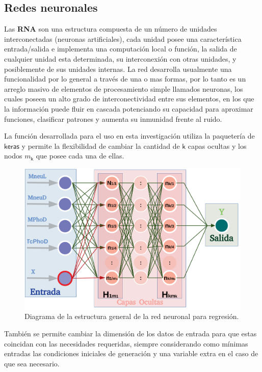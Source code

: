 \subsection{Redes neuronales}
Las \textbf{RNA} son una estructura compuesta de un número de unidades interconectadas (neuronas artificiales), cada unidad posee una característica entrada/salida e implementa una computación local o función, la salida de cualquier unidad esta determinada, su interconexión con otras unidades, y posiblemente de sus unidades internas. La red desarrolla usualmente una funcionalidad por lo general a través de una o mas formas, por lo tanto es un arreglo masivo de elementos de procesamiento simple llamados neuronas, los cuales poseen un alto grado de interconectividad entre sus elementos, en los que la información puede fluir en cascada potenciando su capacidad para aproximar funciones, clasificar patrones y aumenta su inmunidad frente al ruido. 

La función desarrollada para el uso en esta investigación utiliza la paquetería de $\textsf{keras}$ y permite la flexibilidad de cambiar la cantidad de $\textsf{k}$ capas ocultas y los nodos $m_\textsf{k}$ que posee cada una de ellas.



\begin{figure}[!ht]
\centering
\includegraphics[width=1\textwidth]{Simulacion/imagenes/neuronas.png}
\caption{Diagrama de la estructura general de la red neuronal para regresión.}
\label{neuronas}
\end{figure}

También se permite cambiar la dimensión de los datos de entrada para que estas coincidan con las necesidades requeridas, siempre considerando como mínimas entradas las condiciones iniciales de generación y una variable extra en el caso de que sea necesario.

